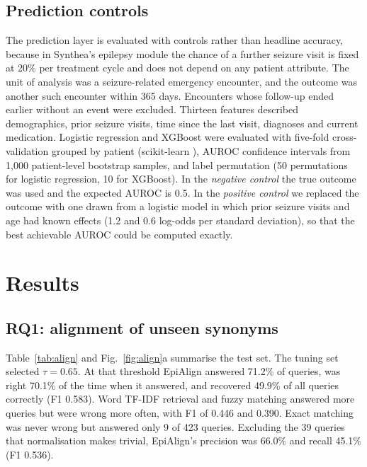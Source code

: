 \documentclass[preprint,12pt]{elsarticle}
\begin{document}
\subsection{Prediction controls}
The prediction layer is evaluated with controls rather than headline accuracy, because in Synthea's epilepsy module the chance of a further seizure visit is fixed at 20\% per treatment cycle and does not depend on any patient attribute. The unit of analysis was a seizure-related emergency encounter, and the outcome was another such encounter within 365 days. Encounters whose follow-up ended earlier without an event were excluded. Thirteen features described demographics, prior seizure visits, time since the last visit, diagnoses and current medication. Logistic regression and XGBoost \cite{chen2016} were evaluated with five-fold cross-validation grouped by patient (scikit-learn \cite{pedregosa2011}), AUROC confidence intervals from 1,000 patient-level bootstrap samples, and label permutation (50 permutations for logistic regression, 10 for XGBoost). In the \textit{negative control} the true outcome was used and the expected AUROC is 0.5. In the \textit{positive control} we replaced the outcome with one drawn from a logistic model in which prior seizure visits and age had known effects (1.2 and 0.6 log-odds per standard deviation), so that the best achievable AUROC could be computed exactly.

\section{Results}
\label{sec:results}

\subsection{RQ1: alignment of unseen synonyms}
Table~\ref{tab:align} and Fig.~\ref{fig:align}a summarise the test set. The tuning set selected $\tau=0.65$. At that threshold EpiAlign answered 71.2\% of queries, was right 70.1\% of the time when it answered, and recovered 49.9\% of all queries correctly (F1 0.583). Word TF-IDF retrieval and fuzzy matching answered more queries but were wrong more often, with F1 of 0.446 and 0.390. Exact matching was never wrong but answered only 9 of 423 queries. Excluding the 39 queries that normalisation makes trivial, EpiAlign's precision was 66.0\% and recall 45.1\% (F1 0.536).
\end{document}
